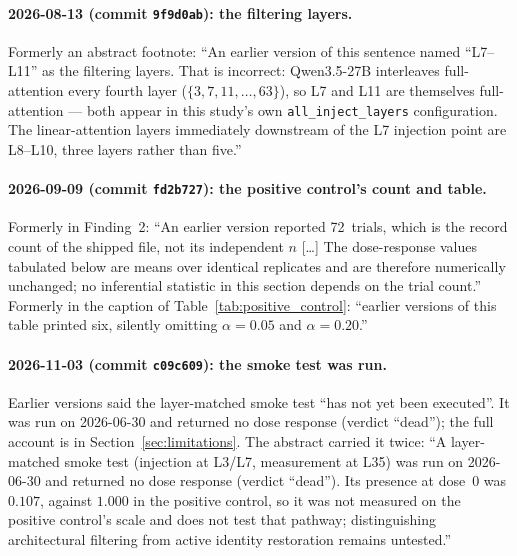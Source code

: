 \documentclass[11pt,a4paper]{article}
\begin{document}
\paragraph{2026-08-13 (commit \texttt{9f9d0ab}): the filtering layers.}
Formerly an abstract footnote: ``An earlier version of this sentence named
``L7--L11'' as the filtering layers. That is incorrect: Qwen3.5-27B
interleaves full-attention every fourth layer
($\{3,7,11,\ldots,63\}$), so L7 and L11 are themselves full-attention
--- both appear in this study's own \texttt{all\_inject\_layers}
configuration. The linear-attention layers immediately downstream of the
L7 injection point are L8--L10, three layers rather than five.''

\paragraph{2026-09-09 (commit \texttt{fd2b727}): the positive control's
count and table.} Formerly in Finding~2: ``An earlier version reported
72~trials, which is the record count of the shipped file, not its
independent $n$ [\ldots] The dose-response values tabulated below are
means over identical replicates and are therefore numerically unchanged;
no inferential statistic in this section depends on the trial count.''
Formerly in the caption of Table~\ref{tab:positive_control}: ``earlier
versions of this table printed six, silently omitting $\alpha{=}0.05$ and
$\alpha{=}0.20$.''

\paragraph{2026-11-03 (commit \texttt{c09c609}): the smoke test was
run.} Earlier versions said the layer-matched smoke test ``has not yet
been executed''. It was run on 2026-06-30 and returned no dose response
(verdict ``dead''); the full account is in Section~\ref{sec:limitations}.
The abstract carried it twice: ``A layer-matched smoke test (injection at
L3/L7, measurement at L35) was run on 2026-06-30 and returned no dose
response (verdict ``dead''). Its presence at dose~0 was $0.107$, against
$1.000$ in the positive control, so it was not measured on the positive
control's scale and does not test that pathway; distinguishing
architectural filtering from active identity restoration remains
untested.''
\end{document}
